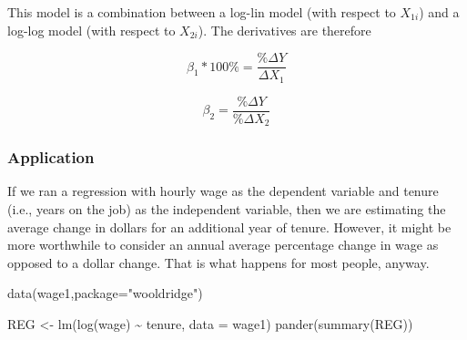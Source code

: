 \documentclass[
]{book}
\newenvironment{Shaded}{\begin{snugshade}}{\end{snugshade}}
\newcommand{\AttributeTok}[1]{\textcolor[rgb]{0.77,0.63,0.00}{#1}}
\newcommand{\FunctionTok}[1]{\textcolor[rgb]{0.00,0.00,0.00}{#1}}
\newcommand{\NormalTok}[1]{#1}
\newcommand{\OtherTok}[1]{\textcolor[rgb]{0.56,0.35,0.01}{#1}}
\newcommand{\SpecialCharTok}[1]{\textcolor[rgb]{0.00,0.00,0.00}{#1}}
\newcommand{\StringTok}[1]{\textcolor[rgb]{0.31,0.60,0.02}{#1}}
\begin{document}
This model is a combination between a log-lin model (with respect to \(X_{1i}\)) and a log-log model (with respect to \(X_{2i}\)). The derivatives are therefore

\[\beta_1 * 100\% = \frac{\% \Delta Y}{\Delta X_1}\]

\[\beta_2= \frac{\% \Delta Y}{\%\Delta X_2}\]

\hypertarget{application-5}{%
\subsubsection*{Application}\label{application-5}}

If we ran a regression with hourly wage as the dependent variable and tenure (i.e., years on the job) as the independent variable, then we are estimating the average change in dollars for an additional year of tenure. However, it might be more worthwhile to consider an annual average percentage change in wage as opposed to a dollar change. That is what happens for most people, anyway.

\begin{Shaded}
\begin{Highlighting}[]
\FunctionTok{data}\NormalTok{(wage1,}\AttributeTok{package=}\StringTok{"wooldridge"}\NormalTok{)}

\NormalTok{REG }\OtherTok{\textless{}{-}} \FunctionTok{lm}\NormalTok{(}\FunctionTok{log}\NormalTok{(wage) }\SpecialCharTok{\textasciitilde{}}\NormalTok{ tenure, }\AttributeTok{data =}\NormalTok{ wage1)}
\FunctionTok{pander}\NormalTok{(}\FunctionTok{summary}\NormalTok{(REG))}
\end{Highlighting}
\end{Shaded}
\end{document}
